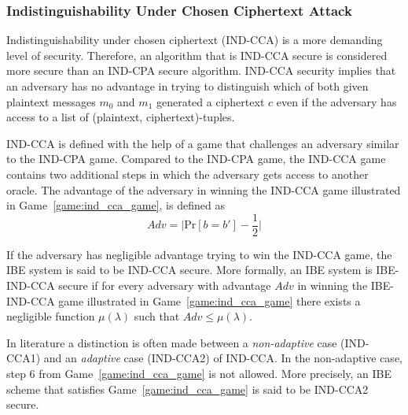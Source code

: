 \subsubsection{Indistinguishability Under Chosen Ciphertext Attack}
Indistinguishability under chosen ciphertext (IND-CCA) is a more demanding level of security. Therefore, an algorithm that is IND-CCA secure is considered more secure than an IND-CPA secure algorithm. IND-CCA security implies that an adversary has no advantage in trying to distinguish which of both given plaintext messages $m_0$ and $m_1$ generated a ciphertext $c$ even if the adversary has access to a list of (plaintext, ciphertext)-tuples.

IND-CCA is defined with the help of a game that challenges an adversary similar to the IND-CPA game. Compared to the IND-CPA game, the IND-CCA game contains two additional steps in which the adversary gets access to another oracle. %
The advantage of the adversary in winning the IND-CCA game illustrated in Game~\ref{game:ind_cca_game}, is defined as
\begin{equation*}
 Adv = \lvert \textrm{Pr} \left[ b = b' \right] - \frac{1}{2} \rvert
\end{equation*}

If the adversary has negligible advantage trying to win the IND-CCA game, the IBE system is said to be IND-CCA secure. More formally, an IBE system is IBE-IND-CCA secure if for every adversary with advantage $Adv$ in winning the IBE-IND-CCA game illustrated in Game~\ref{game:ind_cca_game} there exists a negligible function $\mu \left( \lambda \right)$ such that $Adv \leq \mu \left( \lambda \right)$.

In literature a distinction is often made between a \textit{non-adaptive} case (IND-CCA1) and an \textit{adaptive} case (IND-CCA2) of IND-CCA. In the non-adaptive case, step 6 from Game~\ref{game:ind_cca_game} is not allowed. More precisely, an IBE scheme that satisfies Game~\ref{game:ind_cca_game} is said to be IND-CCA2 secure.

